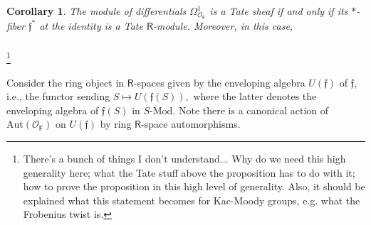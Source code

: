 \documentclass{amsart}
\newtheorem{Cor}[Thm]{Corollary}
\newtheorem{Lem}[Thm]{Lemma}
\theoremstyle{definition}
\newcommand{\OOF}{\OO_{\mathsf{F}}}
\newcommand{\sC}{\mathscr{C}}
\newcommand{\sss}{\subsubsection{}}
\newcommand{\OO}{\mathscr{O}}
\renewcommand{\mod}{\text{-}\on{Mod}}
\newcommand{\on}{\mathrm}
\newcommand{\Ring}{\mathsf{R}}
\newcommand{\ff}{\mathfrak{f}}
\numberwithin{equation}{section}
\begin{document}
\begin{Cor} The module of differentials $\Omega^1_{\OOF}$ is a Tate sheaf if and only if its $*$-fiber $\ff^*$ at the identity is a Tate $\Ring$-module. Moreover, in this case, 
    
\end{Cor}






















\sss \footnote{There's a bunch of things I don't understand... Why do we need this high generality here; what the Tate stuff above the proposition has to do with it; how to prove the proposition in this high level of generality. Also, it should be explained what this statement becomes for Kac-Moody groups, e.g. what the Frobenius twist is.}






 Consider the ring object in $\Ring$-spaces given by the enveloping algebra $U(\ff)$ of $\ff$, i.e., the functor sending $S \mapsto U(\ff(S)),$ where the latter denotes the enveloping algebra of $\ff(S)$ in $S\mod$. Note there is a canonical action of $\on{Aut}(\OOF)$ on $U(\ff)$ by ring $\Ring$-space automorphisms. 
\fi 

\end{document}
